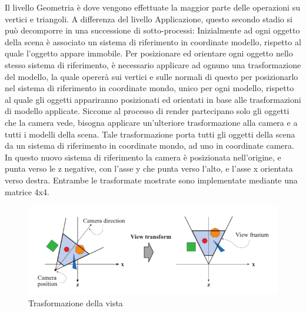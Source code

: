 Il livello Geometria è dove vengono effettuate la maggior parte delle operazioni su vertici e triangoli. A differenza del livello Applicazione, questo secondo stadio si può decomporre in una successione di sotto-processi:
Inizialmente ad ogni oggetto della scena è associato un sistema di riferimento in coordinate modello, rispetto al quale l’oggetto appare immobile. Per posizionare ed orientare ogni oggetto nello stesso sistema di riferimento, è necessario applicare ad ognuno una trasformazione del modello, la quale opererà sui vertici e sulle normali di questo per posizionarlo nel sistema di riferimento in coordinate mondo, unico per ogni modello, rispetto al quale gli oggetti appariranno posizionati ed orientati in base alle trasformazioni di modello applicate. Siccome al processo di render partecipano solo gli oggetti che la camera vede, bisogna applicare un’ulteriore trasformazione alla camera e a tutti i modelli della scena. Tale trasformazione porta tutti gli oggetti della scena da un sistema di riferimento in coordinate mondo, ad uno in coordinate camera. In questo nuovo sistema di riferimento la camera è posizionata nell’origine, e punta verso le z negative, con l’asse y che punta verso l’alto, e l’asse x orientata verso destra. Entrambe le trasformate mostrate sono implementate mediante una matrice 4x4. 
\\
\begin{figure}[htb]
 \centering
 \includegraphics[width=1.0\linewidth]{images/chapter_stato_arte/stato_arte_view_transform.png}\hfill
 \caption[Trasformazione della vista]{Trasformazione della vista}
 \label{fig:stato_arte_trasfvista}
\end{figure}

